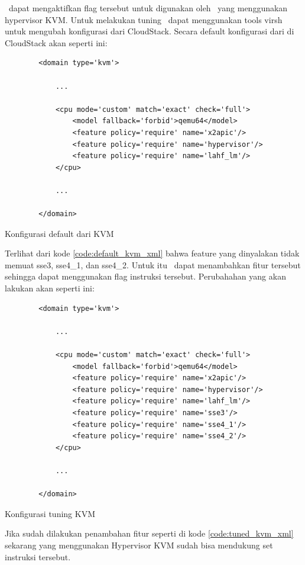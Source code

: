 \saya\ dapat mengaktifkan flag tersebut untuk digunakan oleh \vm\ yang menggunakan hypervisor KVM. Untuk melakukan tuning \saya\ dapat menggunakan tools virsh untuk mengubah konfigurasi \vm dari CloudStack. Secara default konfigurasi dari \vm di CloudStack akan seperti ini:

\begin{listing}[H]
	\begin{verbatim}
		<domain type='kvm'>
		
			...
			
			<cpu mode='custom' match='exact' check='full'>
				<model fallback='forbid'>qemu64</model>
				<feature policy='require' name='x2apic'/>
				<feature policy='require' name='hypervisor'/>
				<feature policy='require' name='lahf_lm'/>
			</cpu>
			
			...
			
		</domain>
	\end{verbatim}
	\caption{Konfigurasi default dari KVM}
	\label{code:default_kvm_xml}
\end{listing}

Terlihat dari kode \ref{code:default_kvm_xml} bahwa feature yang dinyalakan tidak memuat sse3, sse4\_1, dan sse4\_2. Untuk itu \saya\ dapat menambahkan fitur tersebut sehingga \vm dapat menggunakan flag instruksi tersebut. Perubahahan yang akan \saya lakukan akan seperti ini:

\begin{listing}[H]
	\begin{verbatim}
		<domain type='kvm'>
		
			...
			
			<cpu mode='custom' match='exact' check='full'>
				<model fallback='forbid'>qemu64</model>
				<feature policy='require' name='x2apic'/>
				<feature policy='require' name='hypervisor'/>
				<feature policy='require' name='lahf_lm'/>
				<feature policy='require' name='sse3'/>
				<feature policy='require' name='sse4_1'/>
				<feature policy='require' name='sse4_2'/>
			</cpu>
			
			...
			
		</domain>
	\end{verbatim}
	\caption{Konfigurasi tuning KVM}
	\label{code:tuned_kvm_xml}
\end{listing}

Jika sudah dilakukan penambahan fitur seperti di kode \ref{code:tuned_kvm_xml} sekarang \vm yang menggunakan Hypervisor KVM sudah bisa mendukung set instruksi tersebut.

